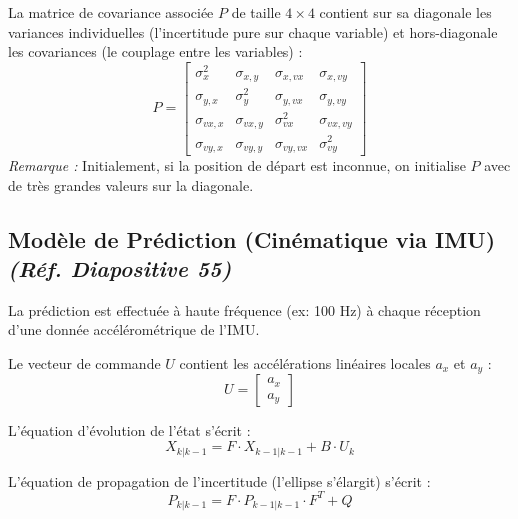 La matrice de covariance associée $P$ de taille $4 \times 4$ contient sur sa diagonale les variances individuelles (l'incertitude pure sur chaque variable) et hors-diagonale les covariances (le couplage entre les variables) :
\begin{equation}
P = \begin{bmatrix} 
\sigma_{x}^2 & \sigma_{x,y} & \sigma_{x,vx} & \sigma_{x,vy} \\ 
\sigma_{y,x} & \sigma_{y}^2 & \sigma_{y,vx} & \sigma_{y,vy} \\ 
\sigma_{vx,x} & \sigma_{vx,y} & \sigma_{vx}^2 & \sigma_{vx,vy} \\ 
\sigma_{vy,x} & \sigma_{vy,y} & \sigma_{vy,vx} & \sigma_{vy}^2 
\end{bmatrix}
\end{equation}
\textit{Remarque :} Initialement, si la position de départ est inconnue, on initialise $P$ avec de très grandes valeurs sur la diagonale. 

\subsection{Modèle de Prédiction (Cinématique via IMU) \textit{(Réf. Diapositive 55)}}
La prédiction est effectuée à haute fréquence (ex: 100 Hz) à chaque réception d'une donnée accélérométrique de l'IMU.

Le vecteur de commande $U$ contient les accélérations linéaires locales $a_x$ et $a_y$ :
\begin{equation}
U = \begin{bmatrix} a_x \\ a_y \end{bmatrix}
\end{equation}

L'équation d'évolution de l'état s'écrit :
\begin{equation}
X_{k|k-1} = F \cdot X_{k-1|k-1} + B \cdot U_k
\end{equation}

L'équation de propagation de l'incertitude (l'ellipse s'élargit) s'écrit :
\begin{equation}
P_{k|k-1} = F \cdot P_{k-1|k-1} \cdot F^T + Q
\end{equation}

